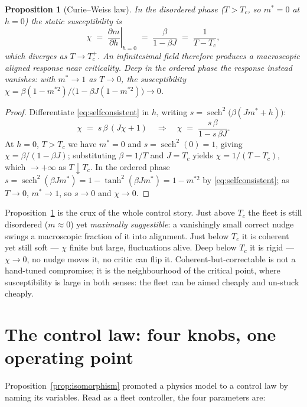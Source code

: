 \documentclass[11pt]{article}
\newtheorem{proposition}{Proposition}
\DeclareMathOperator{\sech}{sech}
\begin{document}
\begin{proposition}[Curie--Weiss law]
\label{prop:chi}
In the disordered phase ($T>T_c$, so $m^{*}=0$ at $h=0$) the static susceptibility is
\begin{equation}
\chi \;=\; \left.\frac{\partial m}{\partial h}\right|_{h=0} \;=\; \frac{\beta}{1-\beta J} \;=\; \frac{1}{T-T_c},
\label{eq:chi}
\end{equation}
which diverges as $T\to T_c^{+}$. An infinitesimal field therefore produces a macroscopic aligned response near
criticality. Deep in the ordered phase the response instead \emph{vanishes}: with $m^{*}\to1$ as $T\to0$, the
susceptibility $\chi=\beta(1-m^{*2})/\bigl(1-\beta J(1-m^{*2})\bigr)\to0$.
\end{proposition}

\begin{proof}
Differentiate \eqref{eq:selfconsistent} in $h$, writing $s=\sech^2\!\bigl(\beta(Jm^{*}+h)\bigr)$:
\[
\chi \;=\; s\,\beta\,(J\chi+1)
\quad\Longrightarrow\quad
\chi \;=\; \frac{s\,\beta}{1 - s\,\beta J}.
\]
At $h=0$, $T>T_c$ we have $m^{*}=0$ and $s=\sech^2(0)=1$, giving $\chi=\beta/(1-\beta J)$; substituting
$\beta=1/T$ and $J=T_c$ yields $\chi=1/(T-T_c)$, which $\to+\infty$ as $T\downarrow T_c$. In the ordered phase
$s=\sech^2(\beta Jm^{*})=1-\tanh^2(\beta Jm^{*})=1-m^{*2}$ by \eqref{eq:selfconsistent}; as $T\to0$,
$m^{*}\to1$, so $s\to0$ and $\chi\to0$.
\end{proof}

Proposition~\ref{prop:chi} is the crux of the whole control story. Just above $T_c$ the fleet is still
disordered ($m\approx0$) yet \emph{maximally suggestible}: a vanishingly small correct nudge swings a
macroscopic fraction of it into alignment. Just below $T_c$ it is coherent yet still soft --- $\chi$ finite but
large, fluctuations alive. Deep below $T_c$ it is rigid --- $\chi\to0$, no nudge moves it, no critic can flip
it. Coherent-but-correctable is not a hand-tuned compromise; it is the neighbourhood of the critical point,
where susceptibility is large in both senses: the fleet can be aimed cheaply and un-stuck cheaply.

\section{The control law: four knobs, one operating point}
\label{sec:control}

Proposition~\ref{prop:isomorphism} promoted a physics model to a control law by naming its variables. Read as a
fleet controller, the four parameters are:
\end{document}
